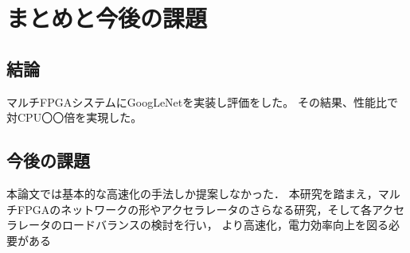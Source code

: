 \chapter{まとめと今後の課題}
{
\label{chap:conclusion}
\section{結論}
\label{sec:conclusion}
マルチFPGAシステムにGoogLeNetを実装し評価をした。
その結果、性能比で対CPU〇〇倍を実現した。

\section{今後の課題}
\label{sec:future}
本論文では基本的な高速化の手法しか提案しなかった．
本研究を踏まえ，マルチFPGAのネットワークの形やアクセラレータのさらなる研究，そして各アクセラレータのロードバランスの検討を行い，
より高速化，電力効率向上を図る必要がある
}
